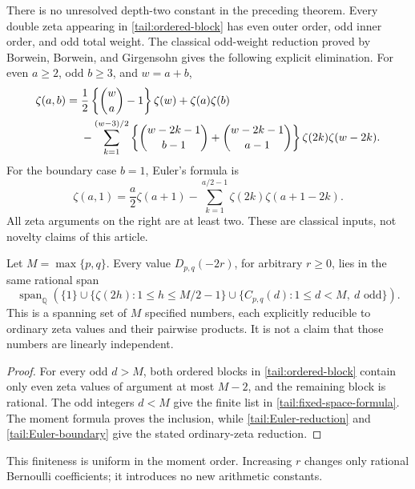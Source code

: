 There is no unresolved depth-two constant in the preceding theorem.
Every double zeta appearing in \eqref{tail:ordered-block} has even
outer order, odd inner order, and odd total weight. The classical
odd-weight reduction proved by Borwein, Borwein, and Girgensohn
\cite{BBG} gives the following explicit elimination. For even
\(a\ge2\), odd \(b\ge3\), and \(w=a+b\),
\begin{align}\label{tail:Euler-reduction}
 \zeta(a,b)={}&\frac12\left\{\binom wa-1\right\}\zeta(w)
              +\zeta(a)\zeta(b)\notag\\
 &-\sum_{k=1}^{(w-3)/2}
 \left\{\binom{w-2k-1}{b-1}+\binom{w-2k-1}{a-1}\right\}
                 \zeta(2k)\zeta(w-2k).
\end{align}
For the boundary case \(b=1\), Euler's formula is
\begin{equation}\label{tail:Euler-boundary}
 \zeta(a,1)=\frac a2\zeta(a+1)
            -\sum_{k=1}^{a/2-1}\zeta(2k)\zeta(a+1-2k).
\end{equation}
All zeta arguments on the right are at least two. These are classical
inputs, not novelty claims of this article.

\begin{corollary}
\label{tail:fixed-space}
Let \(M=\max\{p,q\}\). Every value \(D_{p,q}(-2r)\), for
arbitrary \(r\ge0\), lies in the same rational span
\begin{equation}\label{tail:fixed-space-formula}
 \operatorname{span}_{\mathbb Q}
 \left(\{1\}\cup
       \{\zeta(2h):1\le h\le M/2-1\}\cup
       \{C_{p,q}(d):1\le d<M,\ d\text{ odd}\}\right).
\end{equation}
This is a spanning set of \(M\) specified numbers, each explicitly
reducible to ordinary zeta values and their pairwise products.
It is not a claim that those numbers are linearly independent.
\end{corollary}

\begin{proof}
For every odd \(d>M\), both ordered blocks in
\eqref{tail:ordered-block} contain only even zeta values of argument
at most \(M-2\), and the remaining block is rational. The odd
integers \(d<M\) give the finite list in
\eqref{tail:fixed-space-formula}. The moment formula proves the
inclusion, while \eqref{tail:Euler-reduction} and
\eqref{tail:Euler-boundary} give the stated ordinary-zeta reduction.
\end{proof}

This finiteness is uniform in the moment order. Increasing \(r\)
changes only rational Bernoulli coefficients; it introduces no new
arithmetic constants.

